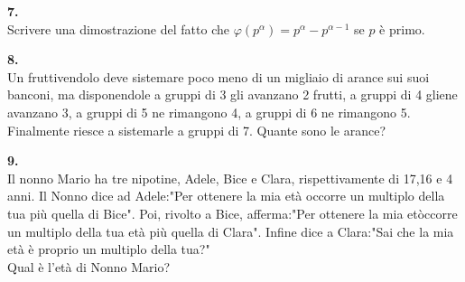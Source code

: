 \documentclass[italian,a4paper,11pt]
{article}
\begin{document}
\vspace{0.4cm}
\noindent
\begin{Ex}\textbf{ 7.}\\ 
Scrivere una dimostrazione del fatto che $\varphi(p^{\alpha})=p^{\alpha}-p^{\alpha -1}$ se $p$ \`e primo.
\end{Ex}

\vspace{0.4cm}
\noindent
\begin{Ex}\textbf{ 8.}\\
Un fruttivendolo deve sistemare poco meno di un migliaio di arance sui suoi banconi, ma disponendole a gruppi di 3 gli avanzano 2 frutti, a gruppi di 4 gliene avanzano 3, a gruppi di 5 ne rimangono 4, a gruppi di 6 ne rimangono 5. Finalmente riesce a sistemarle a gruppi di 7. Quante sono le arance?
\end{Ex}

\vspace{0.4cm}
\noindent
\begin{Ex}\textbf{ 9.}\\
Il nonno Mario ha tre nipotine, Adele, Bice e Clara, rispettivamente di 17,16 e 4 anni. Il Nonno dice ad Adele:"Per ottenere la mia et\`a occorre un multiplo della tua pi\`u quella di Bice". Poi, rivolto a Bice, afferma:"Per ottenere la mia et\` occorre un multiplo della tua et\`a pi\`u quella di Clara". Infine dice a Clara:"Sai che la mia et\`a \`e proprio un multiplo della tua?"\\
Qual \`e l'et\`a di Nonno Mario?
\end{Ex}
\end{document}
